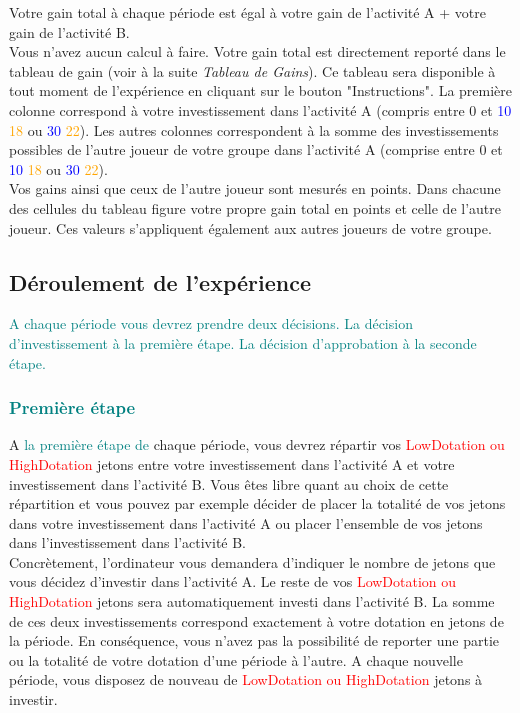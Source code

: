 \documentclass[12pt]{article}
\newcommand{\dotationLow}{LowDotation }
\newcommand{\dotationHigh}{HighDotation }
\begin{document}
\noindent  Votre gain total à chaque période est égal à votre gain de l’activité A + votre gain de l’activité B.\\

\noindent Vous n'avez aucun calcul à faire. Votre gain total est directement reporté dans le tableau de gain (voir à la suite \textit{Tableau de Gains}). Ce tableau sera disponible à tout moment de l'expérience en cliquant sur le bouton "Instructions". La première colonne correspond à votre investissement dans l’activité A (compris entre 0 et \textcolor{blue}{10} \textcolor{orange}{18} ou \textcolor{blue}{30} \textcolor{orange}{22}). Les autres colonnes correspondent à la somme des investissements possibles de l'autre joueur de votre groupe dans l’activité A (comprise entre 0 et \textcolor{blue}{10} \textcolor{orange}{18} ou \textcolor{blue}{30} \textcolor{orange}{22}). \\

\noindent Vos gains ainsi que ceux de l'autre joueur sont mesurés en points. Dans chacune des cellules du tableau figure votre propre gain total en points et celle de l'autre joueur. Ces valeurs s’appliquent également aux autres joueurs de votre groupe. \\

\subsection*{Déroulement de l'expérience}

\textcolor{teal}{\noindent A chaque période vous devrez prendre deux décisions. La décision d'investissement à la première étape. La décision d'approbation à la seconde étape. }

\subsubsection*{\textcolor{teal}{Première étape}}

\noindent A \textcolor{teal}{la première étape de} chaque période, vous devrez répartir vos \textcolor{red}{\dotationLow ou \dotationHigh} jetons entre votre investissement dans l’activité A et votre investissement dans l’activité B. Vous êtes libre quant au choix de cette répartition et vous pouvez par exemple décider de placer la totalité de vos jetons dans votre investissement dans l’activité A ou placer l’ensemble de vos jetons dans l’investissement dans l’activité B.\\

\noindent Concrètement, l’ordinateur vous demandera d’indiquer le nombre de jetons que vous décidez d’investir dans l’activité A. Le reste de vos \textcolor{red}{\dotationLow ou \dotationHigh} jetons sera automatiquement investi dans l’activité B. La somme de ces deux investissements correspond exactement à votre dotation en jetons de la période. En conséquence, vous n’avez pas la possibilité de reporter une partie ou la totalité de votre dotation d’une période à l’autre. A chaque nouvelle période, vous disposez de nouveau de \textcolor{red}{\dotationLow ou \dotationHigh} jetons à investir. \\
\end{document}
